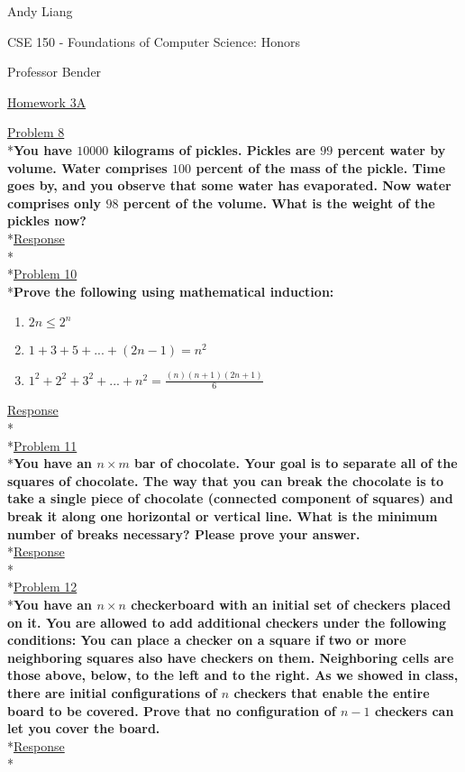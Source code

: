\documentclass[12pt]{article}
\begin{document}
\begin{flushleft}
Andy Liang

CSE 150 - Foundations of Computer Science: Honors

Professor Bender
\end{flushleft}
\medskip
\centerline{\uline{Homework 3A}}
\bigskip\bigskip

\noindent
\uline{Problem 8}
\\*\textbf{You have $10000$ kilograms of pickles. Pickles are $99$ percent water by volume. Water comprises $100$ percent of the mass of the pickle. Time goes by, and you observe that some water has evaporated. Now water comprises only $98$ percent of the volume. What is the weight of the pickles now?}
\smallskip
\\*\uline{Response}
\\*
\medskip
\\*\uline{Problem 10}
\\*\textbf{Prove the following using mathematical induction:}
\begin{enumerate}
	\item \textbf{$2n \leq 2^n$}
	\item \textbf{$1+3+5+...+(2n-1)=n^2$}
	\item \textbf{$1^2+2^2+3^2+...+n^2=\frac{(n)(n+1)(2n+1)}{6}$}
\end{enumerate}
\smallskip
\uline{Response}
\\*
\medskip
\\*\uline{Problem 11}
\\*\textbf{You have an $n\times m$ bar of chocolate. Your goal is to separate all of the squares of chocolate. The way that you can break the chocolate is to take a single piece of chocolate (connected component of squares) and break it along one horizontal  or vertical line. What is the minimum number of breaks necessary? Please prove your answer. }
\smallskip
\\*\uline{Response}
\\*
\medskip
\\*\uline{Problem 12}
\\*\textbf{You have an $n\times n$ checkerboard with an initial set of checkers placed on it. You are allowed to add additional checkers under the following conditions: You can place a checker on a square if two or more neighboring squares also have checkers on them. Neighboring cells are those above, below, to the left and to the right. As we showed in class, there are initial configurations of $n$ checkers that enable the entire board
to be covered. Prove that no configuration of $n-1$ checkers can let you cover the board.}
\smallskip
\\*\uline{Response}
\\*
\end{document}
